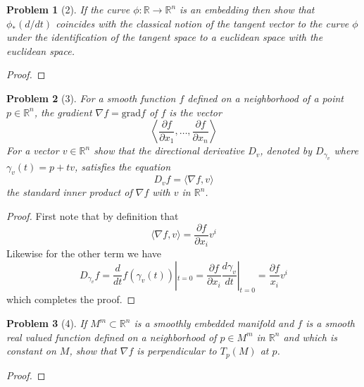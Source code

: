 \documentclass[10pt]{article}
\newcommand{\sk}{\vskip 10mm}
\newcommand{\bb}[1]{\mathbb{#1}}
\theoremstyle{plain}
\newtheorem{problem}{Problem}
\theoremstyle{remark}
\begin{document}
\begin{problem}[2]
  If the curve $\phi:\bb{R}\rightarrow\bb{R}^n$ is an embedding then show that
  $\phi_*(d/dt)$ coincides with the classical notion of the tangent
  vector to the curve $\phi$ under the identification of the tangent
  space to a euclidean space with the euclidean space.
\end{problem}

\begin{proof}
  
\end{proof}

\sk

\begin{problem}[3]
  For a smooth function $f$ defined on a neighborhood of a point
  $p\in \bb{R}^n$, the gradient $\nabla f=\mathrm{grad}f$ of $f$ is the vector
  \[
    \left\langle
      \frac{\partial f}{\partial x_1},\ldots,\frac{\partial f}{\partial x_n}
    \right\rangle
  \]
  For a vector $v\in\bb{R}^n$ show that the directional derivative $D_v$,
  denoted by $D_{\gamma_v}$ where $\gamma_v(t)=p+tv$, satisfies the equation
  \[
    D_vf =\langle \nabla f,v\rangle
  \]
  the standard inner product of $\nabla f$ with $v$ in $\bb{R}^n$.
\end{problem}

\begin{proof}
  First note that by definition that
  \[
    \langle \nabla f,v\rangle=\frac{\partial f}{\partial x_i}v^i
  \]
  Likewise for the other term we have
  \[
    D_{\gamma_v}f=\frac{d}{dt}f(\gamma_v(t))|_{t=0}=\frac{\partial f}{\partial x_i}\frac{d\gamma_v}{dt}|_{t=0}=\frac{\partial f}{x_i}v^i
  \]
  which completes the proof.
\end{proof}

\sk

\begin{problem}[4]
  If $M^m\subset\bb{R}^n$ is a smoothly embedded manifold and $f$
  is a smooth real valued function defined on a neighborhood of
  $p\in M^m$ in $\bb{R}^n$ and which is constant on $M$, show that $\nabla f$
  is perpendicular to $T_p(M)$ at $p$.
\end{problem}

\begin{proof}
  
\end{proof}

\sk

\end{document}
